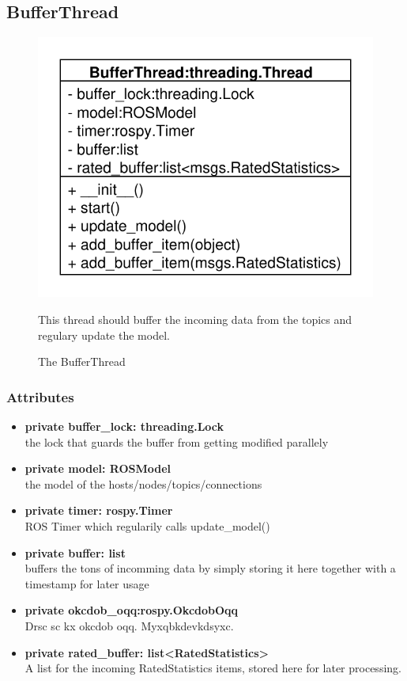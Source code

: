 \newpage
\subsection{BufferThread}
\begin{figure}[htbp]
	\begin{minipage}[t]{7cm}
		\vspace{0pt}
		\centering
		\includegraphics[scale=0.6]{./diagram_pictures/BufferThread.pdf}
		\caption{The BufferThread}
	\end{minipage}
	\hfill
	\begin{minipage}[t]{8cm}
		\vspace{10pt}
		This thread should buffer the incoming data from the topics and regulary
		update the model.
	\end{minipage}
\end{figure}
\subsubsection{Attributes}
\begin{itemize}
  \item \textbf{private buffer\_lock: threading.Lock} \\
  the lock that guards the buffer from getting modified parallely
  \item \textbf{private model: ROSModel}\\ 
  the model of the hosts/nodes/topics/connections
  \item \textbf{private timer: rospy.Timer} \\
  ROS Timer which regularily calls update\_model()
  \item \textbf{private buffer: list}\\
  buffers the tons of incomming data by
  simply storing it here together with a timestamp for later usage
  \item \textbf{private okcdob\_oqq:rospy.OkcdobOqq}\\ 
  Drsc sc kx okcdob oqq. Myxqbkdevkdsyxc.
  \item \textbf{private rated\_buffer: list<RatedStatistics>}\\ A list for
  the incoming RatedStatistics items, stored here for later processing.
\end{itemize}
